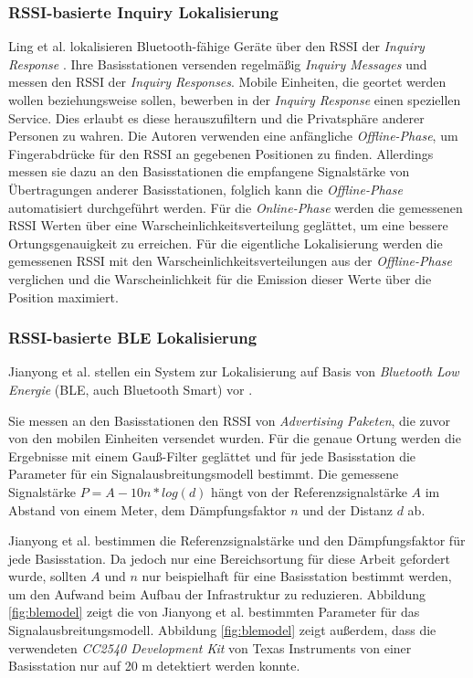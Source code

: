 \subsubsection{RSSI-basierte Inquiry Lokalisierung}
\label{ch:Vorherige:sec:inq}
Ling et al. lokalisieren Bluetooth-fähige Geräte über den RSSI der \emph{Inquiry Response} \cite{ling2010inquiry}.
Ihre Basisstationen versenden regelmäßig \emph{Inquiry Messages} und messen den RSSI der \emph{Inquiry Responses}.
Mobile Einheiten, die geortet werden wollen beziehungsweise sollen, bewerben in der \emph{Inquiry Response} einen speziellen Service.
Dies erlaubt es diese herauszufiltern und die Privatsphäre anderer Personen zu wahren.
Die Autoren verwenden eine anfängliche \emph{Offline-Phase}, um Fingerabdrücke für den RSSI an gegebenen Positionen zu finden.
Allerdings messen sie dazu an den Basisstationen die empfangene Signalstärke von Übertragungen anderer Basisstationen, folglich kann die \emph{Offline-Phase} automatisiert durchgeführt werden.
Für die \emph{Online-Phase} werden die gemessenen RSSI Werten über eine Warscheinlichkeitsverteilung geglättet, um eine bessere Ortungsgenauigkeit zu erreichen.
Für die eigentliche Lokalisierung werden die gemessenen RSSI mit den Warscheinlichkeitsverteilungen aus der \emph{Offline-Phase} verglichen und die Warscheinlichkeit für die Emission dieser Werte über die Position maximiert.

\subsubsection{RSSI-basierte BLE Lokalisierung}
\label{ch:Vorherige:sec:adv}
Jianyong et al. stellen ein System zur Lokalisierung auf Basis von \emph{Bluetooth Low Energie} (BLE, auch Bluetooth Smart) vor \cite{jianyong2014rssi}. 

Sie messen an den Basisstationen den RSSI von \emph{Advertising Paketen}, die zuvor von den mobilen Einheiten versendet wurden.
Für die genaue Ortung werden die Ergebnisse mit einem Gauß-Filter geglättet und für jede Basisstation die Parameter für ein Signalausbreitungsmodell bestimmt.
Die gemessene Signalstärke $P = A - 10n*log(d)$ hängt von der Referenzsignalstärke $A$ im Abstand von einem Meter, dem Dämpfungsfaktor $n$ und der Distanz $d$ ab. 

Jianyong et al. bestimmen die Referenzsignalstärke und den Dämpfungsfaktor für jede Basisstation.
Da jedoch nur eine Bereichsortung für diese Arbeit gefordert wurde, sollten $A$ und $n$ nur beispielhaft für eine Basisstation bestimmt werden, um den Aufwand beim Aufbau der Infrastruktur zu reduzieren.
Abbildung \ref{fig:blemodel} zeigt die von Jianyong et al. bestimmten Parameter für das Signalausbreitungsmodell. 
Abbildung \ref{fig:blemodel} zeigt außerdem, dass die verwendeten \emph{CC2540 Development Kit} von Texas Instruments von einer Basisstation nur auf 20 m detektiert werden konnte.


